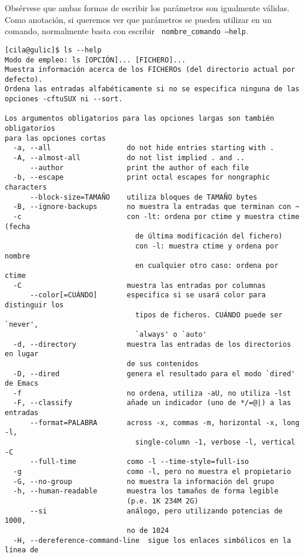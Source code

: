 Obsérvese que ambas  formas de escribir los  parámetros son igualmente
válidas.  Como anotación,  si queremos  ver que  parámetros se  pueden
utilizar  en   un  comando,   normalmente  basta  con   escribir  {\tt
nombre\_comando --help}.

\begin{verbatim}
[cila@gulic]$ ls --help
Modo de empleo: ls [OPCIÓN]... [FICHERO]...
Muestra información acerca de los FICHEROs (del directorio actual por defecto).
Ordena las entradas alfabéticamente si no se especifica ninguna de las
opciones -cftuSUX ni --sort.

Los argumentos obligatorios para las opciones largas son también obligatorios
para las opciones cortas
  -a, --all                  do not hide entries starting with .
  -A, --almost-all           do not list implied . and ..
      --author               print the author of each file
  -b, --escape               print octal escapes for nongraphic characters
      --block-size=TAMAÑO    utiliza bloques de TAMAÑO bytes
  -B, --ignore-backups       no muestra la entradas que terminan con ~
  -c                         con -lt: ordena por ctime y muestra ctime (fecha
                               de última modificación del fichero)
                               con -l: muestra ctime y ordena por nombre
                               en cualquier otro caso: ordena por ctime
  -C                         muestra las entradas por columnas
      --color[=CUÁNDO]       especifica si se usará color para distinguir los
                               tipos de ficheros. CUÁNDO puede ser `never',
                               `always' o `auto'
  -d, --directory            muestra las entradas de los directorios en lugar
                             de sus contenidos
  -D, --dired                genera el resultado para el modo `dired' de Emacs
  -f                         no ordena, utiliza -aU, no utiliza -lst
  -F, --classify             añade un indicador (uno de */=@|) a las entradas
      --format=PALABRA       across -x, commas -m, horizontal -x, long -l,
                               single-column -1, verbose -l, vertical -C
      --full-time            como -l --time-style=full-iso
  -g                         como -l, pero no muestra el propietario
  -G, --no-group             no muestra la información del grupo
  -h, --human-readable       muestra los tamaños de forma legible
                             (p.e. 1K 234M 2G)
      --si                   análogo, pero utilizando potencias de 1000,
                             no de 1024
  -H, --dereference-command-line  sigue los enlaces simbólicos en la línea de

\end{verbatim}

